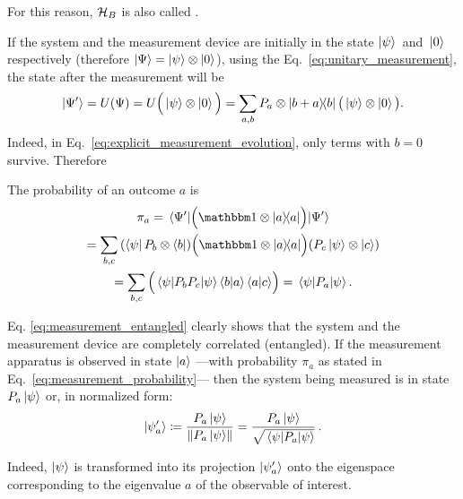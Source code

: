 For this reason, $\mathcal{H}_{B}$ is also called .

If the system and the measurement device are initially in the
state $\ket{\psi}$~and~$\ket{0}$ respectively
(therefore $\ket{\Psi} = \ket{\psi} \otimes \ket{0}$),
using the Eq.~\eqref{eq:unitary_measurement},
the state after the measurement will be %
%
\begin{equation}\label{eq:explicit_measurement_evolution}
  \ket{\Psi^{\prime}} = U(\Psi) = U\Big(\ket{\psi} \otimes \ket{0}\Big) =
    \sum_{a, b} P_a \otimes \ketbra{b+a}{b} \big(\ket{\psi} \otimes \ket{0}\big)
    \text{.}
\end{equation}
Indeed, in Eq.~\eqref{eq:explicit_measurement_evolution}, only terms with $b=0$ survive.
Therefore

The probability of an outcome $a$ is
\begin{multline}\label{eq:measurement_probability}
  \pi_{a} = \expval{\qty\Big(\idop\ox\ketbra{a})}{\Psi^{\prime}} \\
  =
    \sum_{b,c}
      \qty(\bra{\psi}P_{b}\ox\bra{b})
      \qty\Big(\idop\ox\ketbra{a})
      \qty(P_{c}\ket{\psi}\ox\ket{c}) \\
  =
    \sum_{b,c}\qty\Big(\expval{P_bP_c}{\psi} \braket{b}{a} \braket{a}{c}) =
    \expval{P_a}{\psi} \text{.}
\end{multline}

Eq. \eqref{eq:measurement_entangled} clearly shows that the system
and the measurement device are completely correlated (entangled).
If the measurement apparatus is observed in state $\ket{a}$
---with probability $\pi_{a}$ as stated in Eq.~\eqref{eq:measurement_probability}---
then the system being measured is in state $P_{a}\ket{\psi}$
or, in normalized form:
\begin{equation}\label{eq:normalized_collapse}
  \ket{\psi^\prime_a} \coloneqq \frac{P_{a}\ket{\psi}}{\norm{P_{a}\ket{\psi}}}
    = \frac{P_{a}\ket{\psi}}{\sqrt{\expval{P_a}{\psi}}} \,\text{.}
\end{equation}

Indeed,
$\ket{\psi}$
is transformed
into its projection $\ket{\psi^\prime_a}$
onto the eigenspace
corresponding to the eigenvalue $a$ of the observable of interest.

